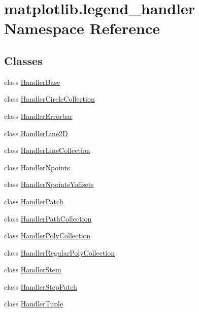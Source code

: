 \hypertarget{namespacematplotlib_1_1legend__handler}{}\section{matplotlib.\+legend\+\_\+handler Namespace Reference}
\label{namespacematplotlib_1_1legend__handler}
\subsection*{Classes}
\begin{DoxyCompactItemize}
\item 
class \hyperlink{classmatplotlib_1_1legend__handler_1_1HandlerBase}{Handler\+Base}
\item 
class \hyperlink{classmatplotlib_1_1legend__handler_1_1HandlerCircleCollection}{Handler\+Circle\+Collection}
\item 
class \hyperlink{classmatplotlib_1_1legend__handler_1_1HandlerErrorbar}{Handler\+Errorbar}
\item 
class \hyperlink{classmatplotlib_1_1legend__handler_1_1HandlerLine2D}{Handler\+Line2D}
\item 
class \hyperlink{classmatplotlib_1_1legend__handler_1_1HandlerLineCollection}{Handler\+Line\+Collection}
\item 
class \hyperlink{classmatplotlib_1_1legend__handler_1_1HandlerNpoints}{Handler\+Npoints}
\item 
class \hyperlink{classmatplotlib_1_1legend__handler_1_1HandlerNpointsYoffsets}{Handler\+Npoints\+Yoffsets}
\item 
class \hyperlink{classmatplotlib_1_1legend__handler_1_1HandlerPatch}{Handler\+Patch}
\item 
class \hyperlink{classmatplotlib_1_1legend__handler_1_1HandlerPathCollection}{Handler\+Path\+Collection}
\item 
class \hyperlink{classmatplotlib_1_1legend__handler_1_1HandlerPolyCollection}{Handler\+Poly\+Collection}
\item 
class \hyperlink{classmatplotlib_1_1legend__handler_1_1HandlerRegularPolyCollection}{Handler\+Regular\+Poly\+Collection}
\item 
class \hyperlink{classmatplotlib_1_1legend__handler_1_1HandlerStem}{Handler\+Stem}
\item 
class \hyperlink{classmatplotlib_1_1legend__handler_1_1HandlerStepPatch}{Handler\+Step\+Patch}
\item 
class \hyperlink{classmatplotlib_1_1legend__handler_1_1HandlerTuple}{Handler\+Tuple}
\end{DoxyCompactItemize}
